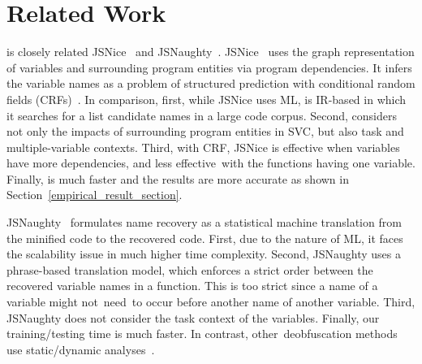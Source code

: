 \section{Related Work}
\label{related_section}

{\tool} is closely related JSNice~\cite{JSNice2015} and
JSNaughty~\cite{JSNaughty2017}.
JSNice~\cite{JSNice2015}
uses the graph representation of variables and
surrounding program entities via program dependencies. It infers
the variable names as a problem of structured prediction with
conditional random fields (CRFs)~\cite{JSNice2015}. In comparison,
first, while JSNice uses ML,
{\tool} is IR-based in which
it searches for a list candidate names in a large code corpus. Second,
{\tool} considers not only the impacts of surrounding program
entities in SVC, but also task and multiple-variable contexts.
Third, with CRF, JSNice is effective when variables have more
dependencies, and less effective~with the functions having one
variable. Finally, {\tool} is much faster and
the results are more accurate as shown in
Section~\ref{empirical_result_section}.

JSNaughty~\cite{JSNaughty2017} formulates name recovery as a
statistical machine translation from the minified code to the
recovered code. First, due to the nature of ML, it faces the
scalability issue in much higher time complexity. Second, JSNaughty
uses a phrase-based translation model, which enforces a strict order
between the recovered variable names in a function. This is too
strict since a name of a variable might not~need~to occur before
another name of another variable.
%
Third, JSNaughty does not consider the task context of
the variables.
Finally, our training/testing time is much faster.
%
In contrast, other~deobfuscation methods use static/dynamic
analyses~\cite{Christodorescu:2003:SAE:1251353.1251365,Moser:2007:EME:1263552.1264210,Udupa05deobfuscation:reverse}.


